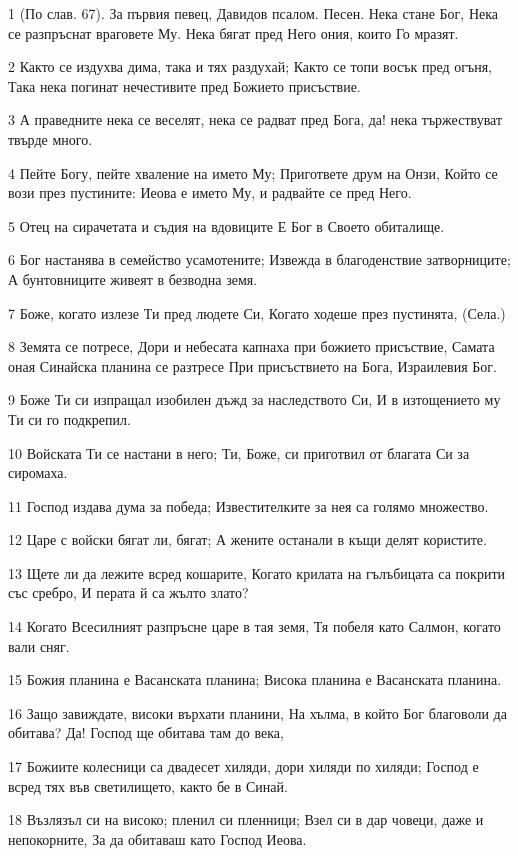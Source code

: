 \par 1 (По слав. 67). За първия певец, Давидов псалом. Песен. Нека стане Бог, Нека се разпръснат враговете Му. Нека бягат пред Него ония, които Го мразят.
\par 2 Както се издухва дима, така и тях раздухай; Както се топи восък пред огъня, Така нека погинат нечестивите пред Божието присъствие.
\par 3 А праведните нека се веселят, нека се радват пред Бога, да! нека тържествуват твърде много.
\par 4 Пейте Богу, пейте хваление на името Му; Пригответе друм на Онзи, Който се вози през пустините: Иеова е името Му, и радвайте се пред Него.
\par 5 Отец на сирачетата и съдия на вдовиците Е Бог в Своето обиталище.
\par 6 Бог настанява в семейство усамотените; Извежда в благоденствие затворниците; А бунтовниците живеят в безводна земя.
\par 7 Боже, когато излезе Ти пред людете Си, Когато ходеше през пустинята, (Села.)
\par 8 Земята се потресе, Дори и небесата капнаха при божието присъствие, Самата оная Синайска планина се разтресе При присъствието на Бога, Израилевия Бог.
\par 9 Боже Ти си изпращал изобилен дъжд за наследството Си, И в изтощението му Ти си го подкрепил.
\par 10 Войската Ти се настани в него; Ти, Боже, си приготвил от благата Си за сиромаха.
\par 11 Господ издава дума за победа; Известителките за нея са голямо множество.
\par 12 Царе с войски бягат ли, бягат; А жените останали в къщи делят користите.
\par 13 Щете ли да лежите всред кошарите, Когато крилата на гълъбицата са покрити със сребро, И перата й са жълто злато?
\par 14 Когато Всесилният разпръсне царе в тая земя, Тя побеля като Салмон, когато вали сняг.
\par 15 Божия планина е Васанската планина; Висока планина е Васанската планина.
\par 16 Защо завиждате, високи върхати планини, На хълма, в който Бог благоволи да обитава? Да! Господ ще обитава там до века,
\par 17 Божиите колесници са двадесет хиляди, дори хиляди по хиляди; Господ е всред тях във светилището, както бе в Синай.
\par 18 Възлязъл си на високо; пленил си пленници; Взел си в дар човеци, даже и непокорните, За да обитаваш като Господ Иеова.
